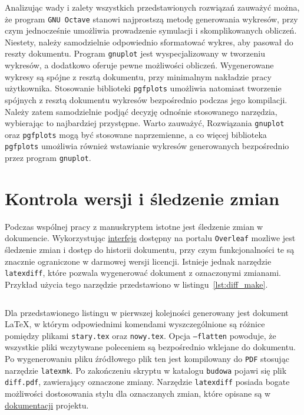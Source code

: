 Analizując wady i zalety wszystkich przedstawionych rozwiązań zauważyć można, że program \texttt{GNU Octave} stanowi najprostszą metodę generowania wykresów, przy czym jednocześnie umożliwia prowadzenie symulacji i skomplikowanych obliczeń. Niestety, należy samodzielnie odpowiednio sformatować wykres, aby pasował do reszty dokumentu. Program \texttt{gnuplot} jest wyspecjalizowany w tworzeniu wykresów, a dodatkowo oferuje pewne możliwości obliczeń. Wygenerowane wykresy są spójne z resztą dokumentu, przy minimalnym nakładzie pracy użytkownika. Stosowanie biblioteki \texttt{pgfplots} umożliwia natomiast tworzenie spójnych z resztą dokumentu wykresów bezpośrednio podczas jego kompilacji. Należy zatem samodzielnie podjąć decyzję odnośnie stosowanego narzędzia, wybierając to najbardziej przystępne. Warto zauważyć, Rozwiązania \texttt{gnuplot} oraz \texttt{pgfplots} mogą być stosowane naprzemienne, a co więcej biblioteka \texttt{pgfplots} umożliwia również wstawianie wykresów generowanych bezpośrednio przez program \texttt{gnuplot}.

\section{Kontrola wersji i śledzenie zmian}

Podczas wspólnej pracy z manuskryptem istotne jest śledzenie zmian w dokumencie. Wykorzystując \href{https://www.overleaf.com}{interfejs} dostępny na portalu \texttt{Overleaf} mozliwe jest śledzenie zmian i dostęp do historii dokumentu, przy czym funkcjonalności te są znacznie ograniczone w darmowej wersji licencji. Istnieje jednak narzędzie \texttt{latexdiff}, które pozwala wygenerować dokument z oznaczonymi zmianami. Przykład użycia tego narzędzie przedstawiono w listingu~\ref{lst:diff_make}.

\begin{listing}[htb]
\inputminted{bash}{skrypty/diff_make.sh}
\end{listing}

Dla przedstawionego listingu w pierwszej kolejności generowany jest dokument \LaTeX{}, w którym odpowiednimi komendami wyszczególnione są różnice pomiędzy plikami \texttt{stary.tex} oraz \texttt{nowy.tex}. Opcja \texttt{--flatten} powoduje, że wszystkie pliki wczytywane poleceniem \texttt{} są bezpośrednio wklejane do dokumentu. Po wygenerowaniu pliku źródłowego plik ten jest kompilowany do \texttt{PDF} stosując narzędzie \texttt{latexmk}. Po zakończeniu skryptu w katalogu \texttt{budowa} pojawi się plik \texttt{diff.pdf}, zawierający oznaczone zmiany. Narzędzie \texttt{latexdiff} posiada bogate możliwości dostosowania stylu dla oznaczanych zmian, które opisane są w \href{http://mirrors.ctan.org/support/latexdiff/doc/latexdiff-man.pdf}{dokumentacji} projektu.

